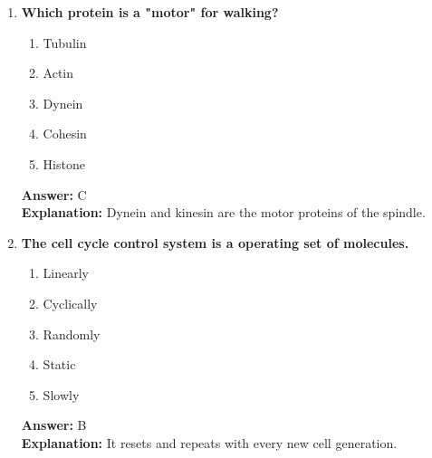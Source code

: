 \documentclass[11pt, a4paper]{article}
\begin{document}
\begin{enumerate}[leftmargin=*, label=\arabic*.]
\item \textbf{Which protein is a "motor" for walking?}
\begin{enumerate}[label=\Alph*.]
\item Tubulin
\item Actin
\item Dynein
\item Cohesin
\item Histone
\end{enumerate}
\textbf{Answer:} C \\
\textbf{Explanation:} Dynein and kinesin are the motor proteins of the spindle.

\item \textbf{The cell cycle control system is a \underline{\hspace{1cm}} operating set of molecules.}
\begin{enumerate}[label=\Alph*.]
\item Linearly
\item Cyclically
\item Randomly
\item Static
\item Slowly
\end{enumerate}
\textbf{Answer:} B \\
\textbf{Explanation:} It resets and repeats with every new cell generation.

\end{enumerate}
\end{document}
